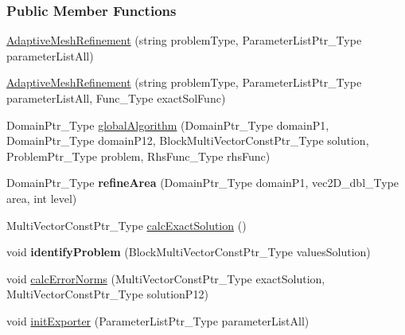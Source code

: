 \subsubsection*{Public Member Functions}
\begin{DoxyCompactItemize}
\item 
\hyperlink{classFEDD_1_1AdaptiveMeshRefinement_ad736272ed2b7eec557fe50b49de6654e}{Adaptive\+Mesh\+Refinement} (string problem\+Type, Parameter\+List\+Ptr\+\_\+\+Type parameter\+List\+All)
\item 
\hyperlink{classFEDD_1_1AdaptiveMeshRefinement_ad5f475f6ca3eb55635d9838b1c641ca8}{Adaptive\+Mesh\+Refinement} (string problem\+Type, Parameter\+List\+Ptr\+\_\+\+Type parameter\+List\+All, Func\+\_\+\+Type exact\+Sol\+Func)
\item 
Domain\+Ptr\+\_\+\+Type \hyperlink{classFEDD_1_1AdaptiveMeshRefinement_ac695e101f66364a347d05451ec3e1a26}{global\+Algorithm} (Domain\+Ptr\+\_\+\+Type domain\+P1, Domain\+Ptr\+\_\+\+Type domain\+P12, Block\+Multi\+Vector\+Const\+Ptr\+\_\+\+Type solution, Problem\+Ptr\+\_\+\+Type problem, Rhs\+Func\+\_\+\+Type rhs\+Func)
\item 
\mbox{\label{classFEDD_1_1AdaptiveMeshRefinement_a00adcb9d7cbdbc0e5a901662fbf8a9e4}} 
Domain\+Ptr\+\_\+\+Type {\bfseries refine\+Area} (Domain\+Ptr\+\_\+\+Type domain\+P1, vec2\+D\+\_\+dbl\+\_\+\+Type area, int level)
\item 
\mbox{\label{classFEDD_1_1AdaptiveMeshRefinement_ab99e4f813aff9a485ad0f64211cfb0fa}} 
Multi\+Vector\+Const\+Ptr\+\_\+\+Type \hyperlink{classFEDD_1_1AdaptiveMeshRefinement_ab99e4f813aff9a485ad0f64211cfb0fa}{calc\+Exact\+Solution} ()
\item 
\mbox{\label{classFEDD_1_1AdaptiveMeshRefinement_ae1249c5ae853284c90a95a6ed7e1ae76}} 
void {\bfseries identify\+Problem} (Block\+Multi\+Vector\+Const\+Ptr\+\_\+\+Type values\+Solution)
\item 
void \hyperlink{classFEDD_1_1AdaptiveMeshRefinement_aec6233132c77e92c78ab820acb7c523c}{calc\+Error\+Norms} (Multi\+Vector\+Const\+Ptr\+\_\+\+Type exact\+Solution, Multi\+Vector\+Const\+Ptr\+\_\+\+Type solution\+P12)
\item 
void \hyperlink{classFEDD_1_1AdaptiveMeshRefinement_a29b6de9d13d734aa86669bc0add28c25}{init\+Exporter} (Parameter\+List\+Ptr\+\_\+\+Type parameter\+List\+All)

\end{DoxyCompactItemize}
